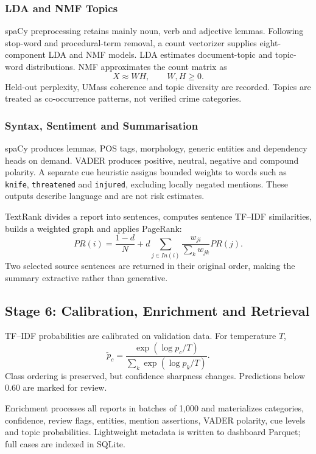 \documentclass[conference]{IEEEtran}
\begin{document}
\subsubsection{LDA and NMF Topics}
spaCy preprocessing retains mainly noun, verb and adjective lemmas. Following stop-word and procedural-term removal, a count vectorizer supplies eight-component LDA and NMF models. LDA estimates document-topic and topic-word distributions. NMF approximates the count matrix as
\begin{equation}
X\approx WH,\qquad W,H\geq0.
\end{equation}
Held-out perplexity, UMass coherence and topic diversity are recorded. Topics are treated as co-occurrence patterns, not verified crime categories.

\subsubsection{Syntax, Sentiment and Summarisation}
spaCy produces lemmas, POS tags, morphology, generic entities and dependency heads on demand. VADER produces positive, neutral, negative and compound polarity. A separate cue heuristic assigns bounded weights to words such as \texttt{knife}, \texttt{threatened} and \texttt{injured}, excluding locally negated mentions. These outputs describe language and are not risk estimates.

TextRank divides a report into sentences, computes sentence TF--IDF similarities, builds a weighted graph and applies PageRank:
\begin{equation}
PR(i)=\frac{1-d}{N}+
d\sum_{j\in In(i)}
\frac{w_{ji}}{\sum_k w_{jk}}PR(j).
\end{equation}
Two selected source sentences are returned in their original order, making the summary extractive rather than generative.

\subsection{Stage 6: Calibration, Enrichment and Retrieval}

TF--IDF probabilities are calibrated on validation data. For temperature $T$,
\begin{equation}
\tilde p_c=
\frac{\exp(\log p_c/T)}
{\sum_k\exp(\log p_k/T)}.
\end{equation}
Class ordering is preserved, but confidence sharpness changes. Predictions below 0.60 are marked for review.

Enrichment processes all reports in batches of 1,000 and materializes categories, confidence, review flags, entities, mention assertions, VADER polarity, cue levels and topic probabilities. Lightweight metadata is written to dashboard Parquet; full cases are indexed in SQLite.
\end{document}
